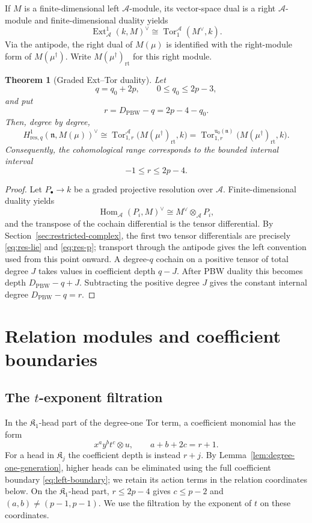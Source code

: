 \documentclass[11pt]{article}
\theoremstyle{plain}
\newtheorem{theorem}{Theorem}[section]
\theoremstyle{definition}
\theoremstyle{remark}
\numberwithin{equation}{section}
\newcommand{\kk}{k}
\newcommand{\Kalg}{\mathfrak K}
\newcommand{\Ext}{\operatorname{Ext}}
\newcommand{\Tor}{\operatorname{Tor}}
\newcommand{\Hom}{\operatorname{Hom}}
\newcommand{\uenv}{\mathrm u}
\begin{document}
If $M$ is a finite-dimensional left $\mathcal A$-module, its vector-space dual is a right
$\mathcal A$-module and finite-dimensional duality yields
\[
 \Ext^1_{\mathcal A}(\kk,M)^\vee\cong\Tor^{\mathcal A}_1(M^\vee,\kk).
\]
Via the antipode, the right dual of $M(\mu)$ is identified with the right-module form of
$M(\mu^\dagger)$.  Write $M(\mu^\dagger)_{\mathrm{rt}}$ for this right module.

\begin{theorem}[Graded Ext--Tor duality]\label{thm:pbw-duality}
Let
\[
 q=q_0+2p,
 \qquad 0\le q_0\le2p-3,
\]
and put
\[
 r=D_{\mathrm{PBW}}-q=2p-4-q_0.
\]
Then, degree by degree,
\begin{equation}\label{eq:pbw-duality}
 H^1_{\mathrm{res},q}(\mathfrak n,M(\mu))^\vee
 \cong
 \Tor^{\mathcal A}_{1,r}
 \bigl(M(\mu^\dagger)_{\mathrm{rt}},\kk\bigr)
 =
 \Tor^{\uenv_0(\mathfrak n)}_{1,r}
 \bigl(M(\mu^\dagger)_{\mathrm{rt}},\kk\bigr).
\end{equation}
Consequently, the cohomological range corresponds to the bounded internal interval
\[
 -1\le r\le2p-4.
\]
\end{theorem}

\begin{proof}
Let $P_\bullet\to\kk$ be a graded projective resolution over $\mathcal A$.
Finite-dimensional duality yields
\[
 \Hom_{\mathcal A}(P_i,M)^\vee\cong M^\vee\otimes_{\mathcal A}P_i,
\]
and the transpose of the cochain differential is the tensor differential.  By Section~\ref{sec:restricted-complex}, the first two tensor differentials are precisely
\eqref{eq:res-lie} and \eqref{eq:res-p}; transport through the antipode gives the left
convention used from this point onward.  A degree-$q$ cochain on a positive tensor of total
degree $J$ takes values in coefficient depth $q-J$.  After PBW duality this becomes depth
$D_{\mathrm{PBW}}-q+J$.  Subtracting the positive degree $J$ gives the constant internal degree
$D_{\mathrm{PBW}}-q=r$.
\end{proof}

\section{Relation modules and coefficient boundaries}\subsection{The \texorpdfstring{$t$}{t}-exponent filtration}\label{sec:koszul}

In the $\Kalg_1$-head part of the degree-one Tor term, a coefficient monomial has the
form
\[
 x^ay^bt^c\otimes u,
 \qquad
 a+b+2c=r+1.
\]
For a head in $\Kalg_j$ the coefficient depth is instead $r+j$.  By
Lemma~\ref{lem:degree-one-generation}, higher heads can be eliminated using the full
coefficient boundary \eqref{eq:left-boundary}; we retain its action terms in the relation
coordinates below.  On the $\Kalg_1$-head part, $r\le2p-4$ gives $c\le p-2$ and
$(a,b)\ne(p-1,p-1)$.  We use the filtration by the exponent of $t$ on these coordinates.
\end{document}
